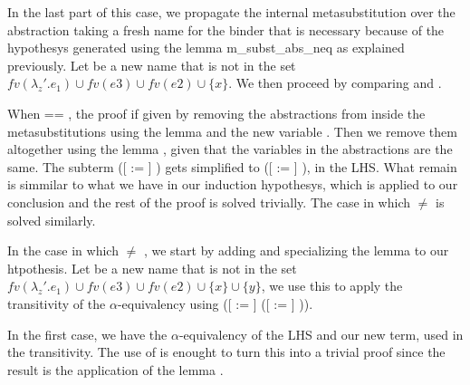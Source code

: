 \begin{coqdoccode}
\end{coqdoccode}
In the last part of this case, we propagate the internal metasubstitution over the abstraction taking a fresh name for the binder that is necessary because of the hypothesys generated using the lemma m\_subst\_abs\_neq as explained previously. Let  be a new name that is not in the set $fv(\lambda_z'.e_1) \cup fv(e3) \cup fv(e2) \cup \{x\}$. We then proceed by comparing  and .
\begin{coqdoccode}
\end{coqdoccode}
When  == , the proof if given by removing the abstractions from inside the metasubstitutions using the lemma  and the new variable . Then we remove them altogether using the lemma , given that the variables in the abstractions are the same. The subterm    ([ := ]    ) gets simplified to ([ := ]    ), in the LHS. What remain is simmilar to what we have in our induction hypothesys, which is applied to our conclusion and the rest of the proof is solved trivially. The case in which  \ensuremath{\not=}  is solved similarly.
\begin{coqdoccode}
\end{coqdoccode}
In the case in which  \ensuremath{\not=} , we start by adding and specializing the lemma  to our htpothesis. Let  be a new name that is not in the set $fv(\lambda_z'.e_1) \cup fv(e3) \cup fv(e2) \cup \{x\} \cup \{y\}$, we use this to apply the transitivity of the $\alpha$-equivalency using ([ := ]   ([ := ]    )). 
\begin{coqdoccode}
\end{coqdoccode}
In the first case, we have the $\alpha$-equivalency of the LHS and our new term, used in the transitivity. The use of  is enought to turn this into a trivial proof since the result is the application of the lemma . 
\begin{coqdoccode}
\end{coqdoccode}
